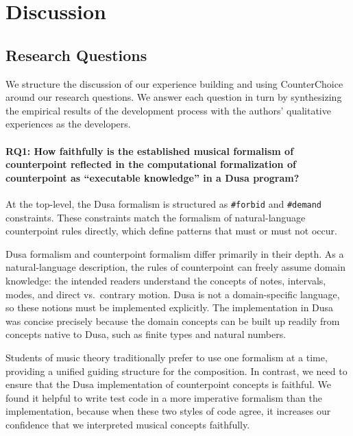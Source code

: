 \section{Discussion}
\label{sec:discussion}


\subsection{Research Questions}
We structure the discussion of our experience building and using CounterChoice around our research questions.
We answer each question in turn by synthesizing the empirical results of the development process with the authors' qualitative experiences as the developers.

\paragraph{RQ1: How faithfully is the established musical formalism of counterpoint reflected in the computational formalization of counterpoint as ``executable knowledge'' in a Dusa program?}
At the top-level, the Dusa formalism is structured as \verb|#forbid| and \verb|#demand| constraints.
These constraints match the formalism of natural-language counterpoint rules directly, which define patterns that must or must not occur.

Dusa formalism and counterpoint formalism differ primarily in their depth.
As a natural-language description, the rules of counterpoint can freely assume domain knowledge: the intended readers understand the concepts of notes, intervals, modes, and direct vs.\ contrary motion.
Dusa is not a domain-specific language, so these notions must be implemented explicitly.
The implementation in Dusa was concise precisely because the domain concepts can be built up readily from concepts native to Dusa, such as finite types and natural numbers.

Students of music theory traditionally prefer to use one formalism at a time, providing a unified guiding structure for the composition.
In contrast, we need to ensure that the Dusa implementation of counterpoint concepts is faithful.
We found it helpful to write test code in a more imperative formalism than the implementation, because when these two styles of code agree, it increases our confidence that we interpreted musical concepts faithfully.
 
